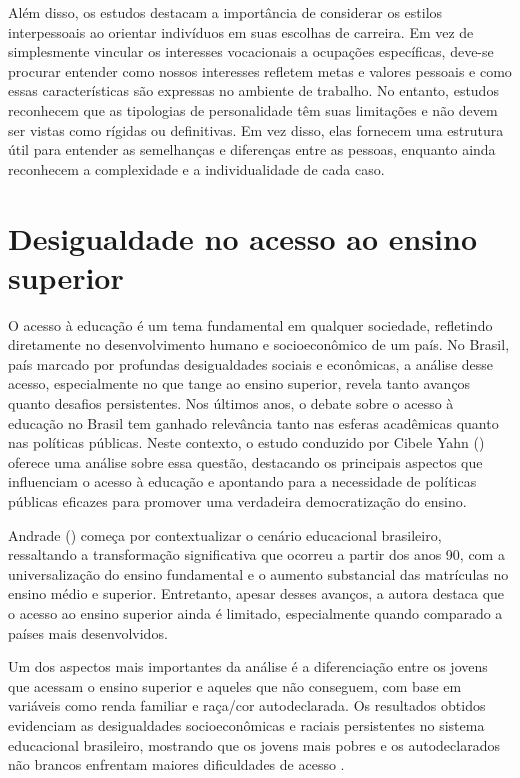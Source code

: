 Além disso, os estudos destacam a importância de considerar os estilos interpessoais ao orientar indivíduos em suas escolhas de carreira. Em vez de simplesmente vincular os interesses vocacionais a ocupações específicas, deve-se procurar entender como nossos interesses refletem metas e valores pessoais e como essas características são expressas no ambiente de trabalho.  No entanto, estudos reconhecem que as tipologias de personalidade têm suas limitações e não devem ser vistas como rígidas ou definitivas. Em vez disso, elas fornecem uma estrutura útil para entender as semelhanças e diferenças entre as pessoas, enquanto ainda reconhecem a complexidade e a individualidade de cada caso.


\section{Desigualdade no acesso ao ensino superior}

O acesso à educação é um tema fundamental em qualquer sociedade, refletindo diretamente no desenvolvimento humano e socioeconômico de um país. No Brasil, país marcado por profundas desigualdades sociais e econômicas, a análise desse acesso, especialmente no que tange ao ensino superior, revela tanto avanços quanto desafios persistentes. Nos últimos anos, o debate sobre o acesso à educação no Brasil tem ganhado relevância tanto nas esferas acadêmicas quanto nas políticas públicas. Neste contexto, o estudo conduzido por Cibele Yahn (\citeyear{de2012acesso}) oferece uma análise sobre essa questão, destacando os principais aspectos que influenciam o acesso à educação e apontando para a necessidade de políticas públicas eficazes para promover uma verdadeira democratização do ensino.

Andrade (\citeyear{de2012acesso}) começa por contextualizar o cenário educacional brasileiro, ressaltando a transformação significativa que ocorreu a partir dos anos 90, com a universalização do ensino fundamental e o aumento substancial das matrículas no ensino médio e superior. Entretanto, apesar desses avanços, a autora destaca que o acesso ao ensino superior ainda é limitado, especialmente quando comparado a países mais desenvolvidos.

Um dos aspectos mais importantes da análise é a diferenciação entre os jovens que acessam o ensino superior e aqueles que não conseguem, com base em variáveis como renda familiar e raça/cor autodeclarada. Os resultados obtidos evidenciam as desigualdades socioeconômicas e raciais persistentes no sistema educacional brasileiro, mostrando que os jovens mais pobres e os autodeclarados não brancos enfrentam maiores dificuldades de acesso  \cite{de2012acesso}.

